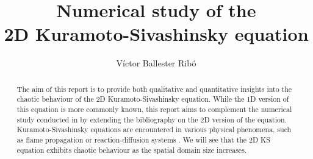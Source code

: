 \documentclass[twoside]{article}
\title{Numerical study of the\\2D Kuramoto-Sivashinsky equation}
\author{Víctor Ballester Ribó}
\date{\parbox{\linewidth}{\centering
Instabilities and Nonlinear Phenomena\endgraf
M2 - Applied and Theoretical Mathematics\endgraf
Université Paris-Dauphine, PSL\endgraf
\today}}
\begin{document}
\maketitle
\begin{abstract}
  The aim of this report is to provide both qualitative and quantitative insights into the chaotic behaviour of the 2D Kuramoto-Sivashinsky equation. While the 1D version of this equation is more commonly known, this report aims to complement the numerical study conducted in \cite{Kalogirou2015} by extending the bibliography on the 2D version of the equation. Kuramoto-Sivashinsky equations are encountered in various physical phenomena, such as flame propagation or reaction-diffusion systems \cite{Kuramoto,Sivashinsky1977}. We will see that the 2D KS equation exhibits chaotic behaviour as the spatial domain size increases.
\end{abstract}
\end{document}
